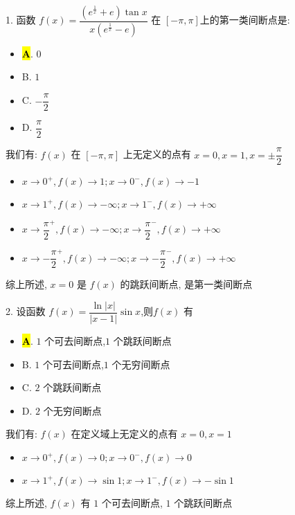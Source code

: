 1. 函数 $f(x)=\dfrac{(e^{\frac{1}{x}}+e)\tan x}{x(e^{\frac{1}{x}}-e)}$ 在 $[-\pi,\pi]$上的第一类间断点是:
\begin{itemize}
	\item \hl{\textbf{A}}. $0$
	\item B. $1$
	\item C. $-\dfrac{\pi}{2}$
	\item D. $\dfrac{\pi}{2}$
\end{itemize}
\begin{solution}

	我们有: $f(x)$ 在 $[-\pi,\pi]$ 上无定义的点有 $x=0, x=1, x=\pm\dfrac{\pi}{2}$

	\begin{itemize}
		\item $x\to 0^{+}, f(x)\to 1 ; x\to 0^{-}, f(x)\to -1$
		\item $x\to 1^{+}, f(x)\to -\infty ; x\to 1^{-}, f(x)\to +\infty$
		\item $x\to \dfrac{\pi}{2}^{+}, f(x)\to -\infty ; x\to \dfrac{\pi}{2}^{-}, f(x)\to +\infty$
		\item $x\to -\dfrac{\pi}{2}^{+}, f(x)\to -\infty ; x\to -\dfrac{\pi}{2}^{-}, f(x)\to +\infty$
	\end{itemize}

	综上所述, $x=0$ 是 $f(x)$ 的跳跃间断点, 是第一类间断点
\end{solution}

2. 设函数 $f(x)=\dfrac{\ln|x|}{|x-1|}\sin x$,则$f(x)$ 有
\begin{itemize}
	\item \hl{\textbf{A}}. $1$ 个可去间断点,$1$ 个跳跃间断点
	\item B. $1$ 个可去间断点,$1$ 个无穷间断点
	\item C. $2$ 个跳跃间断点
	\item D. $2$ 个无穷间断点
\end{itemize}
\begin{solution}

	我们有: $f(x)$ 在定义域上无定义的点有 $x=0, x=1$
	\begin{itemize}
		\item $x\to 0^{+}, f(x)\to 0 ; x\to 0^{-}, f(x)\to 0$
		\item $x\to 1^{+}, f(x)\to \sin 1 ; x\to 1^{-}, f(x)\to -\sin 1$
	\end{itemize}

	综上所述, $f(x)$ 有 $1$ 个可去间断点, $1$ 个跳跃间断点
\end{solution}

